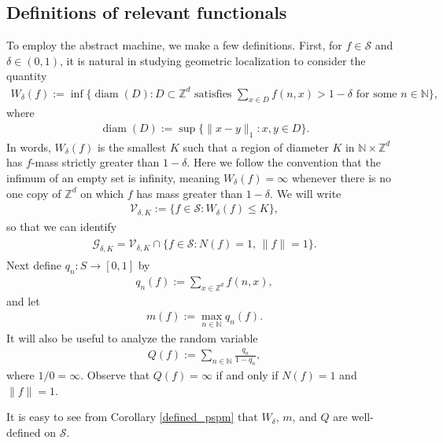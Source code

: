 \documentclass[11pt,reqno]{amsart}
\numberwithin{equation}{section}
\theoremstyle{definition}
\begin{document}
\subsection{Definitions of relevant functionals}
To employ the abstract machine, we make a few definitions.
First, for $f\in {\mathcal{S}}$ and $\delta \in (0,1)$, it is natural in studying geometric localization to consider the quantity
{\begin{align*} {
W_\delta(f) := \inf\bigg\{\operatorname{diam}(D) : D \subset {\mathbb{Z}}^d \text{ satisfies } \sum_{x \in D} f(n,x) > 1 - \delta \text{ for some $n \in {\mathbb{N}}$}\bigg\},
} \end{align*}}
where
{\begin{align*} {
\operatorname{diam}(D) := \sup\{\|x - y\|_1 : x,y \in D\}.
} \end{align*}}
In words, $W_\delta(f)$ is the smallest $K$ such that a region of diameter $K$ in ${\mathbb{N}} \times {\mathbb{Z}}^d$ has $f$-mass strictly greater than $1-\delta$.
Here we follow the convention that the infimum of an empty set is infinity, meaning $W_\delta(f) = \infty$ whenever there is no one copy of ${\mathbb{Z}}^d$ on which $f$ has mass greater than $1-\delta$.
We will write
{\begin{align*} {
{\mathcal{V}}_{\delta,K} := \{f \in {\mathcal{S}} : W_\delta(f) \leq K\},
} \end{align*}}
so that we can identify
{\begin{align} \begin{split} {
{\mathcal{G}}_{\delta,K} = {\mathcal{V}}_{\delta,K} \cap \{f \in {\mathcal{S}} : N(f) = 1,\, \|f\| = 1\}. \label{g_intersection}
} \end{split} \end{align}}
Next define $q_n : S \to [0,1]$ by
{\begin{align*} {
q_n(f) := \sum_{x\in {\mathbb{Z}}^d} f(n,x),
} \end{align*}}
and let
{\begin{align*} {
m(f) := \max_{n\in {\mathbb{N}}} q_n(f).
} \end{align*}}
It will also be useful to analyze the random variable
{\begin{align*} {
Q(f) := \sum_{n \in {\mathbb{N}}} \frac{q_n}{1 - q_n},
} \end{align*}}
where $1/0 = \infty$.
Observe that $Q(f) = \infty$ if and only if $N(f) = 1$ and $\|f\| = 1$.

It is easy to see from Corollary \ref{defined_pspm} that $W_\delta$, $m$, and $Q$ are well-defined on ${\mathcal{S}}$.
\end{document}
